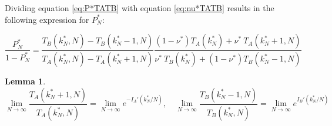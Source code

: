 \documentclass{article}
\theoremstyle{definition}
\newtheorem{lemma}{Lemma}[section]
\begin{document}
Dividing equation \eqref{eq:P*TATB} with equation \eqref{eq:nu*TATB} results in the following expression for $P^*_N$:
    
\begin{equation}
    \frac{P^*_N}{1-P^*_N} = 
    \frac
    {T_B(k^*_N,N) - T_B(k^*_N-1,N)}
    {T_A(k^*_N,N) - T_A(k^*_N+1,N)}
    \frac
    {(1-\nu^*) T_A(k^*_N) + \nu^* \ T_A(k^*_N+1,N)}
    {\nu^* \ T_B(k^*_N) + (1-\nu^*) T_B(k^*_N-1,N)}
\end{equation}

\begin{lemma}
\label{lemma:TA(k+1)/TA(k)}
    \begin{equation}
        \lim_{N \to \infty} 
        \frac{T_A(k^*_N+1,N)}{T_A(k^*_N,N)} = 
        \lim_{N \to \infty} 
        e^{-I_A'(k^*_N/N)}, \quad
        \lim_{N \to \infty}
        \frac{T_B(k^*_N-1,N)}{T_B(k^*_N,N)} = 
        \lim_{N \to \infty} 
        e^{I_B'(k^*_N/N)}
    \end{equation}
    
\end{lemma}
\end{document}
